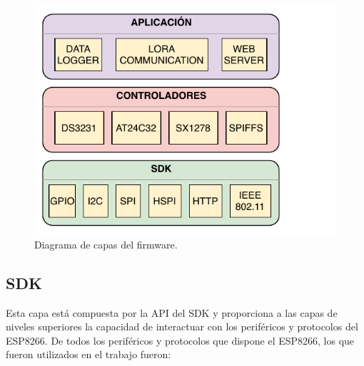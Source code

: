 \begin{figure}[h]
	\centering
	\includegraphics[scale=1]{./Figures/firmware_layers.pdf}
	\caption{Diagrama de capas del firmware.}
		\label{fig:cuadradoAzul}
\end{figure}


\subsection{SDK}

Esta capa está compuesta por la API del SDK y proporciona a las capas de niveles superiores la capacidad de interactuar con los periféricos y protocolos del ESP8266. De todos los periféricos y protocolos que dispone el ESP8266, los que fueron utilizados en el trabajo fueron:

